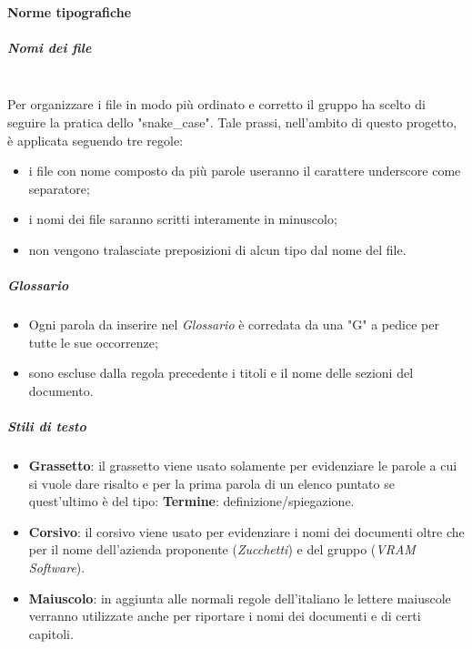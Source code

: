         \paragraph{Norme tipografiche}
                \subparagraph{Nomi dei file}\mbox{}\\ [1mm]
                    Per organizzare i file in modo più ordinato e corretto il gruppo ha scelto di seguire la pratica dello "snake\_case"\glo.
                    Tale prassi, nell'ambito di questo progetto\glo, è applicata seguendo tre regole:
                    \begin{itemize}
                        \item i file con nome composto da più parole useranno il carattere underscore come separatore;
                        \item i nomi dei file saranno scritti interamente in minuscolo;
                        \item non vengono tralasciate preposizioni di alcun tipo dal nome del file.
                    \end{itemize}
                \subparagraph{Glossario}
                    \begin{itemize}
                        \item Ogni parola da inserire nel \textit{Glossario} è corredata da una "G" a pedice per tutte le sue occorrenze;
                        \item sono escluse dalla regola precedente i titoli e il nome delle sezioni del documento.
                    \end{itemize}
                \subparagraph{Stili di testo}
                \begin{itemize}
                    \item \textbf{Grassetto}: il grassetto viene usato solamente per evidenziare le parole a cui si vuole dare risalto e per la prima parola
                                              di un elenco puntato se quest'ultimo è del tipo: \textbf{Termine}: definizione/spiegazione.
                    \item \textbf{Corsivo}: il corsivo viene usato per evidenziare i nomi dei documenti oltre che per il nome dell'azienda
                                            proponente (\textit{Zucchetti}) e del gruppo (\textit{VRAM Software}).
                    \item \textbf{Maiuscolo}: in aggiunta alle normali regole dell'italiano le lettere maiuscole verranno utilizzate anche per riportare i nomi dei
                                              documenti e di certi capitoli.
                \end{itemize}
